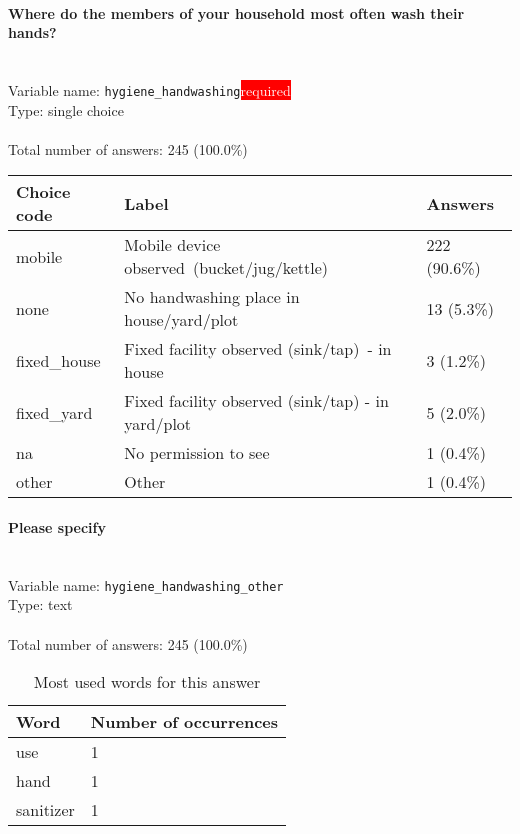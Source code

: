 \documentclass[11.5pt, a4paper]{scrartcl}
\begin{document}
\paragraph{Where do the members of your household most often wash their hands? }
\  \\Variable name: \texttt{hygiene\_handwashing}\hfill\colorbox{red}{\small{\textcolor{white}{required}}}\\
 Type: single choice\\
\\Total number of answers: 245 (100.0\%)
\\[0.2em] \begin{tabular}{p{4cm}|p{8cm}|p{3cm}}
Choice code & Label & Answers \\
\hline
mobile & Mobile device observed (bucket/jug/kettle)& \cellcolor{color4}222 (90.6\%)\\
\cellcolor{mygray} none & \cellcolor{mygray}No handwashing place in house/yard/plot  & \cellcolor{color0}13 (5.3\%)\\
fixed\_house & Fixed facility observed (sink/tap) - in house& \cellcolor{color0}3 (1.2\%)\\
\cellcolor{mygray} fixed\_yard & \cellcolor{mygray}Fixed facility observed (sink/tap) - in yard/plot & \cellcolor{color0}5 (2.0\%)\\
na & No permission to see& \cellcolor{color0}1 (0.4\%)\\
\cellcolor{mygray} other & \cellcolor{mygray}Other & \cellcolor{color0}1 (0.4\%)\\
\end{tabular}
\paragraph{Please specify}
\  \\Variable name: \texttt{hygiene\_handwashing\_other}\\
Type: text\\
\\Total number of answers: 245 (100.0\%)
\\[0.2em]\begin{table}[H]
 \begin{tabular}{p{4cm}|p{8cm}}
Word & Number of occurrences  \\
\hline
\cellcolor{mygray}use&\cellcolor{mygray}1\\
\hline
hand&1\\
\hline
\cellcolor{mygray}sanitizer&\cellcolor{mygray}1\\
\hline
\end{tabular}
\caption{\label{tab:table-name} Most used words for this answer}
\end{table}
\end{document}
